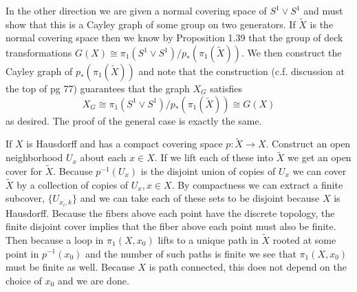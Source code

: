 \documentclass{article}
\newcommand{\exercise}[1]{\noindent{\textbf{Exercise #1:}}}
\begin{document}
In the other direction we are given a normal covering space of
$S^1\vee S^1$ and must show that this is a Cayley graph of some group
on two generators. If $\tilde{X}$ is the normal covering space then we
know by Proposition 1.39 that the group of deck transformations $G(X)
\cong \pi_1(S^1 \vee S^1)/p_*(\pi_1(\tilde{X}))$. We then construct
the Cayley graph of $p_*(\pi_1(\tilde{X}))$ and note that the
construction (c.f. discussion at the top of pg 77) guarantees that the
graph $X_G$ satisfies
\[
X_G \cong \pi_1(S^1 \vee S^1)/p_*(\pi_1(\tilde{X})) \cong G(X)
\]
as desired. The proof of the general case is exactly the same.

\exercise{A1}

If $X$ is Hausdorff and has a compact covering space $p: \tilde{X} \to
X$. Construct an open neighborhood $U_x$ about each $x \in X$. If we
lift each of these into $\tilde{X}$ we get an open cover for
$\tilde{X}$. Because $p^{-1}(U_x)$ is the disjoint union of copies of
$U_x$ we can cover $\tilde{X}$ by a collection of copies of $U_x, x
\in X$. By compactness we can extract a finite subcover,
$\{U_{x_i,k}\}$ and we can take each of these sets to be disjoint
because $X$ is Hausdorff. Because the fibers above each point have the
discrete topology, the finite disjoint cover implies that the fiber
above each point must also be finite. Then because a loop in
$\pi_1(X,x_0)$ lifts to a unique path in $\tilde{X}$ rooted at some
point in $p^{-1}(x_0)$ and the number of such paths is finite we see
that $\pi_1(X,x_0)$ must be finite as well. Because $X$ is path
connected, this does not depend on the choice of $x_0$ and we are
done.

\exercise{A2}
\end{document}
